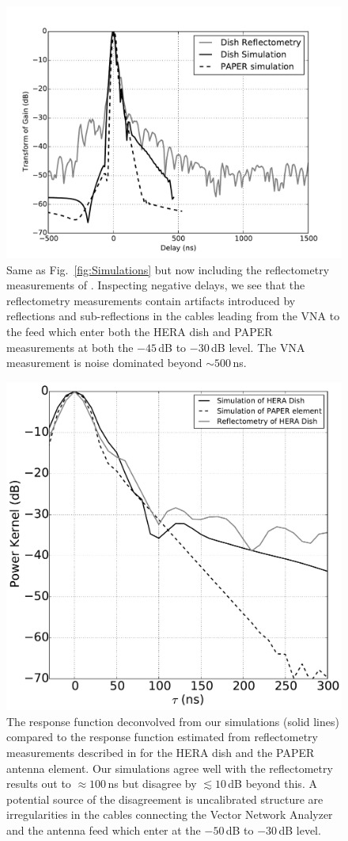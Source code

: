 \documentclass[twocolumn]{emulateapj}
\begin{document}
\begin{figure}
\includegraphics[width=.5\textwidth]{figures/compare_reflectometry_paper.pdf}
\caption{Same as Fig.~\ref{fig:Simulations} but now including 
 the reflectometry measurements of \citep{Patra:2015}. Inspecting negative delays, we see that the reflectometry measurements contain artifacts introduced by reflections and sub-reflections in the cables leading from the VNA to the feed which enter both the HERA dish and PAPER measurements at both the $-45$\,dB to $-30$\,dB level. The VNA measurement is noise dominated beyond $\sim 500$\,ns.}\label{fig:Reflectometry}
\end{figure}

\begin{figure}[h!]
\includegraphics[width=.5\textwidth]{figures/compare_kernels_paper.pdf}
\caption{The response function deconvolved from our simulations (solid lines) compared to the response function estimated from reflectometry measurements described in \citep{Patra:2015} for the HERA dish and the PAPER antenna element. Our simulations agree well with the reflectometry results out to $\approx 100$\,ns but disagree by $\lesssim10$\,dB beyond this. A potential source of the disagreement is uncalibrated structure are irregularities in the cables connecting the Vector Network Analyzer and the antenna feed which enter at the $-50$\,dB to $-30$\,dB level.}
\label{fig:Kernels}
\end{figure}
\end{document}
